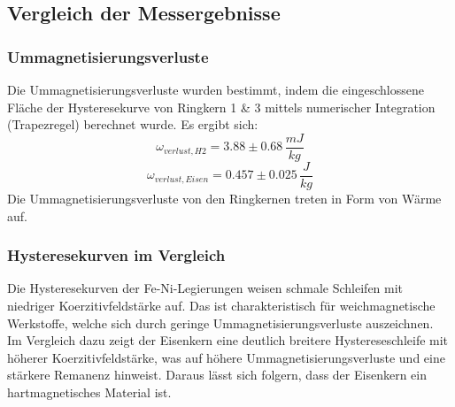     \subsection{Vergleich der Messergebnisse}
    \subsubsection{Ummagnetisierungsverluste}
    Die Ummagnetisierungsverluste wurden bestimmt, indem die eingeschlossene Fläche der Hysteresekurve von Ringkern 1 \& 3
    mittels numerischer Integration (Trapezregel) berechnet wurde. Es ergibt sich:
    \begin{equation*}
        \omega_{verlust, H2} = 3.88 \pm 0.68 \, \frac{mJ}{kg} 
    \end{equation*}
    \begin{equation*}
        \omega_{verlust, Eisen} = 0.457 \pm 0.025 \, \frac{J}{kg}
    \end{equation*}
    Die Ummagnetisierungsverluste von den Ringkernen treten in Form von Wärme auf.
    \subsubsection{Hysteresekurven im Vergleich}
    Die Hysteresekurven der Fe-Ni-Legierungen weisen schmale Schleifen mit niedriger Koerzitivfeldstärke auf.
    Das ist charakteristisch für weichmagnetische Werkstoffe, welche sich durch geringe Ummagnetisierungsverluste
    auszeichnen. \\
    Im Vergleich dazu zeigt der Eisenkern eine deutlich breitere Hystereseschleife mit höherer Koerzitivfeldstärke,
    was auf höhere Ummagnetisierungsverluste und eine stärkere Remanenz hinweist. Daraus lässt sich folgern, dass der Eisenkern
    ein hartmagnetisches Material ist. \\